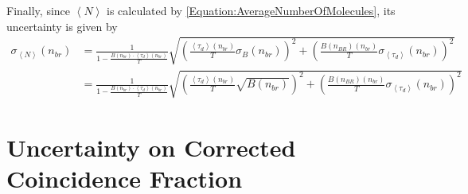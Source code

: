 Finally, since $\left\langle N \right\rangle$ is calculated by \eqref{Equation:AverageNumberOfMolecules}, its uncertainty is given by
\begin{align}
	\sigma_{\left\langle N \right\rangle} (n_{br}) &= \frac{1}{1 - \frac{B(n_{br}) \cdot \left\langle \tau_d \right\rangle (n_{br})}{T}} \sqrt{\left(\frac{\left\langle \tau_d \right\rangle (n_{br})}{T} \sigma_B (n_{br})\right)^2 + \left(\frac{B(n_{BR}) (n_{br})}{T} \sigma_{\left\langle \tau_d \right\rangle} (n_{br})\right)^2 } \\
	&= \frac{1}{1 - \frac{B(n_{br}) \cdot \left\langle \tau_d \right\rangle (n_{br})}{T}} \sqrt{\left(\frac{\left\langle \tau_d \right\rangle (n_{br})}{T} \sqrt{B (n_{br})}\right)^2 + \left(\frac{B(n_{BR}) (n_{br})}{T} \sigma_{\left\langle \tau_d \right\rangle} (n_{br})\right)^2 }
\end{align}

\clearpage

\section{Uncertainty on Corrected Coincidence Fraction} \label{Appendix:UncertaintyOnChanceCoincidenceCorrection}

